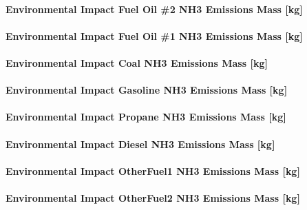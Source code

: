 \paragraph{Environmental Impact Fuel Oil \#2 NH3 Emissions Mass {[}kg{]}}\label{environmental-impact-fuel-oil-2-nh3-emissions-mass-kg}

\paragraph{Environmental Impact Fuel Oil \#1 NH3 Emissions Mass {[}kg{]}}\label{environmental-impact-fuel-oil-1-nh3-emissions-mass-kg}

\paragraph{Environmental Impact Coal NH3 Emissions Mass {[}kg{]}}\label{environmental-impact-coal-nh3-emissions-mass-kg}

\paragraph{Environmental Impact Gasoline NH3 Emissions Mass {[}kg{]}}\label{environmental-impact-gasoline-nh3-emissions-mass-kg}

\paragraph{Environmental Impact Propane NH3 Emissions Mass {[}kg{]}}\label{environmental-impact-propane-nh3-emissions-mass-kg}

\paragraph{Environmental Impact Diesel NH3 Emissions Mass {[}kg{]}}\label{environmental-impact-diesel-nh3-emissions-mass-kg}

\paragraph{Environmental Impact OtherFuel1 NH3 Emissions Mass {[}kg{]}}\label{environmental-impact-otherfuel1-nh3-emissions-mass-kg}

\paragraph{Environmental Impact OtherFuel2 NH3 Emissions Mass {[}kg{]}}\label{environmental-impact-otherfuel2-nh3-emissions-mass-kg}

